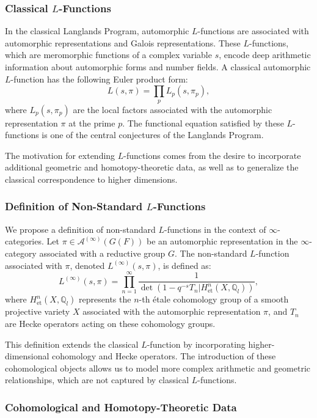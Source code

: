 \documentclass{article}
\theoremstyle{remark}
\begin{document}
\subsubsection{Classical $L$-Functions}

In the classical Langlands Program, automorphic $L$-functions are associated with automorphic representations and Galois representations. These $L$-functions, which are meromorphic functions of a complex variable $s$, encode deep arithmetic information about automorphic forms and number fields. A classical automorphic $L$-function has the following Euler product form:
\[
L(s, \pi) = \prod_{p} L_p(s, \pi_p),
\]
where $L_p(s, \pi_p)$ are the local factors associated with the automorphic representation $\pi$ at the prime $p$. The functional equation satisfied by these $L$-functions is one of the central conjectures of the Langlands Program.

The motivation for extending $L$-functions comes from the desire to incorporate additional geometric and homotopy-theoretic data, as well as to generalize the classical correspondence to higher dimensions.

\subsubsection{Definition of Non-Standard $L$-Functions}

We propose a definition of non-standard $L$-functions in the context of $\infty$-categories. Let $\pi \in \mathcal{A}^{(\infty)}(G(F))$ be an automorphic representation in the $\infty$-category associated with a reductive group $G$. The non-standard $L$-function associated with $\pi$, denoted $L^{(\infty)}(s, \pi)$, is defined as:
\[
L^{(\infty)}(s, \pi) = \prod_{n=1}^{\infty} \frac{1}{\det(1 - q^{-s} T_n | H^n_{\text{et}}(X, \mathbb{Q}_l))},
\]
where $H^n_{\text{et}}(X, \mathbb{Q}_l)$ represents the $n$-th étale cohomology group of a smooth projective variety $X$ associated with the automorphic representation $\pi$, and $T_n$ are Hecke operators acting on these cohomology groups.

This definition extends the classical $L$-function by incorporating higher-dimensional cohomology and Hecke operators. The introduction of these cohomological objects allows us to model more complex arithmetic and geometric relationships, which are not captured by classical $L$-functions.

\subsubsection{Cohomological and Homotopy-Theoretic Data}
\end{document}
